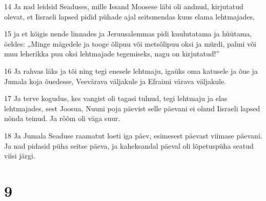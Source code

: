 \par 14 Ja nad leidsid Seaduses, mille Issand Moosese läbi oli andnud, kirjutatud olevat, et Iisraeli lapsed pidid pühade ajal seitsmendas kuus elama lehtmajades,
\par 15 ja et kõigis nende linnades ja Jeruusalemmas pidi kuulutatama ja hüütama, öeldes: „Minge mägedele ja tooge õlipuu või metsõlipuu oksi ja mürdi, palmi või muu leherikka puu oksi lehtmajade tegemiseks, nagu on kirjutatud!”
\par 16 Ja rahvas läks ja tõi ning tegi enesele lehtmaju, igaüks oma katusele ja õue ja Jumala koja õuedesse, Veevärava väljakule ja Efraimi värava väljakule.
\par 17 Ja terve kogudus, kes vangist oli tagasi tulnud, tegi lehtmaju ja elas lehtmajades, sest Joosua, Nuuni poja päevist selle päevani ei olnud Iisraeli lapsed nõnda teinud. Ja rõõm oli väga suur.
\par 18 Ja Jumala Seaduse raamatut loeti iga päev, esimesest päevast viimase päevani. Ja nad pidasid püha seitse päeva, ja kaheksandal päeval oli lõpetuspüha seatud viisi järgi.

\chapter{9}

